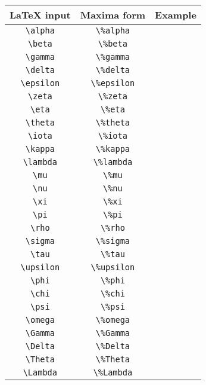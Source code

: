 \begin{tabular}{|c|c|c|}
\hline
LaTeX input & Maxima form & Example \\
\hline
\verb|\alpha| & \verb|\%alpha| & \ue{\verb|\alpha|} \\
\verb|\beta| & \verb|\%beta| & \ue{\verb|\beta|} \\
\verb|\gamma| & \verb|\%gamma| & \ue{\verb|\gamma|} \\
\verb|\delta| & \verb|\%delta| & \ue{\verb|\delta|} \\
\verb|\epsilon| & \verb|\%epsilon| & \ue{\verb|\epsilon|} \\
\verb|\zeta| & \verb|\%zeta| & \ue{\verb|\zeta|} \\
\verb|\eta| & \verb|\%eta| & \ue{\verb|\eta|} \\
\verb|\theta| & \verb|\%theta| & \ue{\verb|\theta|} \\
\verb|\iota| & \verb|\%iota| & \ue{\verb|\iota|} \\
\verb|\kappa| & \verb|\%kappa| & \ue{\verb|\kappa|} \\
\verb|\lambda| & \verb|\%lambda| & \ue{\verb|\lambda|} \\
\verb|\mu| & \verb|\%mu| & \ue{\verb|\mu|} \\
\verb|\nu| & \verb|\%nu| & \ue{\verb|\nu|} \\
\verb|\xi| & \verb|\%xi| & \ue{\verb|\xi|} \\
\verb|\pi| & \verb|\%pi| & \ue{\verb|\pi|} \\
\verb|\rho| & \verb|\%rho| & \ue{\verb|\rho|} \\
\verb|\sigma| & \verb|\%sigma| & \ue{\verb|\sigma|} \\
\verb|\tau| & \verb|\%tau| & \ue{\verb|\tau|} \\
\verb|\upsilon| & \verb|\%upsilon| & \ue{\verb|\upsilon|} \\
\verb|\phi| & \verb|\%phi| & \ue{\verb|\phi|} \\
\verb|\chi| & \verb|\%chi| & \ue{\verb|\chi|} \\
\verb|\psi| & \verb|\%psi| & \ue{\verb|\psi|} \\
\verb|\omega| & \verb|\%omega| & \ue{\verb|\omega|} \\
\verb|\Gamma| & \verb|\%Gamma| & \ue{\verb|\Gamma|} \\
\verb|\Delta| & \verb|\%Delta| & \ue{\verb|\Delta|} \\
\verb|\Theta| & \verb|\%Theta| & \ue{\verb|\Theta|} \\
\verb|\Lambda| & \verb|\%Lambda| & \ue{\verb|\Lambda|} \\

\end{tabular}
